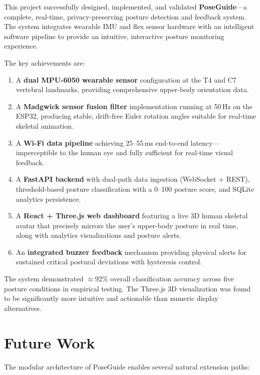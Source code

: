 \documentclass[12pt,a4paper]{report}
\begin{document}
This project successfully designed, implemented, and validated \textbf{PoseGuide}—a complete, real-time, privacy-preserving posture detection and feedback system. The system integrates wearable IMU and flex sensor hardware with an intelligent software pipeline to provide an intuitive, interactive posture monitoring experience.

The key achievements are:

\begin{enumerate}[leftmargin=2em]
    \item A \textbf{dual MPU-6050 wearable sensor} configuration at the T4 and C7 vertebral landmarks, providing comprehensive upper-body orientation data.
    \item A \textbf{Madgwick sensor fusion filter} implementation running at 50\,Hz on the ESP32, producing stable, drift-free Euler rotation angles suitable for real-time skeletal animation.
    \item A \textbf{Wi-Fi data pipeline} achieving 25--55\,ms end-to-end latency—imperceptible to the human eye and fully sufficient for real-time visual feedback.
    \item A \textbf{FastAPI backend} with dual-path data ingestion (WebSocket + REST), threshold-based posture classification with a 0--100 posture score, and SQLite analytics persistence.
    \item A \textbf{React + Three.js web dashboard} featuring a live 3D human skeletal avatar that precisely mirrors the user's upper-body posture in real time, along with analytics visualizations and posture alerts.
    \item An \textbf{integrated buzzer feedback} mechanism providing physical alerts for sustained critical postural deviations with hysteresis control.
\end{enumerate}

The system demonstrated $\approx$92\% overall classification accuracy across five posture conditions in empirical testing. The Three.js 3D visualization was found to be significantly more intuitive and actionable than numeric display alternatives.

\section{Future Work}

The modular architecture of PoseGuide enables several natural extension paths:
\end{document}

